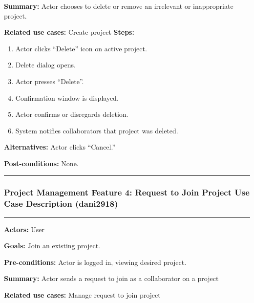 \documentclass[twoside,letterpaper]{article}
\begin{document}
	 \noindent \textbf{Summary:} Actor chooses to delete or remove an irrelevant or inappropriate project.  \newline
	 
	 \noindent \textbf{Related use cases:} Create project\newline
	\textbf{Steps:} \begin{enumerate}
	  \item Actor clicks ``Delete'' icon on active project.
	  \item Delete dialog opens.
	  \item Actor presses ``Delete''.
	  \item Confirmation window is displayed.
	  \item Actor confirms or disregards deletion.
	  \item System notifies collaborators that project was deleted.
	 \end{enumerate}
	 \textbf{Alternatives:} Actor clicks ``Cancel.'' \newline
	 
	 \noindent  \textbf{Post-conditions:} None. \newline
	\vspace{8pt}
	\hrule
	
	\newpage
	
	\subsubsection[Project Management Feature 4: Request to Join Project Use Case Description (dani2918)]{\rmfamily\bfseries\color{black}
		Project Management Feature 4: Request to Join Project Use Case Description (dani2918)}
	\hypertarget{RefHeading22059017292}{}
	\bigskip
	\label{pm:uc6}
	
	\vspace{2pt}
	\hrule
	\vspace{8pt}
	\noindent \textbf{Actors:} User \newline
	
	\noindent\textbf{Goals:} Join an existing project. \newline
	
	\noindent \textbf{Pre-conditions:} Actor is logged in, viewing desired project.  \newline
	
	\noindent \textbf{Summary:} Actor sends a request to join as a collaborator on a project\newline
	
	\noindent \textbf{Related use cases:} Manage request to join project\newline
	
\end{document}
